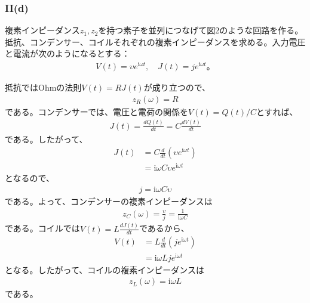 \documentclass[platex,dvipdfmx,a4paper]{jsarticle}
\newcommand{\bbn}[2]{\frac{d #1}{d #2}}
\begin{document}
  \subsubsection*{II(d)}
  複素インピーダンス$z_1,z_2$を持つ素子を並列につなげて図2のような回路を作る。\\
  抵抗、コンデンサー、コイルそれぞれの複素インピーダンスを求める。入力電圧と電流が次のようになるとする：
  \begin{align*}
    V(t)=\upsilon e^{\mathrm{i}\omega t},\quad
    J(t)=je^{\mathrm{i}\omega t}。
  \end{align*}

  抵抗ではOhmの法則$V(t)=RJ(t)$が成り立つので、
  \begin{align*}
    z_R(\omega)=R
  \end{align*}
  である。コンデンサーでは、電圧と電荷の関係を$V(t)=Q(t)/C$とすれば、
  \begin{align*}
    J(t)=\bbn{Q(t)}{t}=C\bbn{V(t)}{t}
  \end{align*}
  である。したがって、
  \begin{align*}
    J(t)
    &=C\bbn{}{t}\left(\upsilon e^{\mathrm{i}\omega t}\right) \\
    &=\mathrm{i}\omega C\upsilon e^{\mathrm{i}\omega t}
  \end{align*}
  となるので、
  \begin{align*}
    j=\mathrm{i}\omega C\upsilon
  \end{align*}
  である。よって、コンデンサーの複素インピーダンスは
  \begin{align*}
    z_C(\omega)=\frac{\upsilon}{j}=\frac{1}{\mathrm{i}\omega C}
  \end{align*}
  である。コイルでは$V(t)=L\bbn{J(t)}{t}$であるから、
  \begin{align*}
    V(t)
    &=L\bbn{}{t}\left(je^{\mathrm{i}\omega t}\right) \\
    &=\mathrm{i}\omega Lje^{\mathrm{i}\omega t}
  \end{align*}
  となる。したがって、コイルの複素インピーダンスは
  \begin{align*}
    z_L(\omega)=\mathrm{i}\omega L
  \end{align*}
  である。
\end{document}
